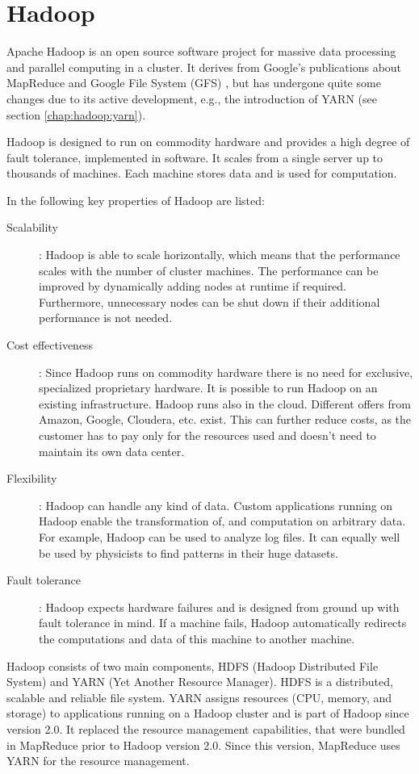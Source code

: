 \chapter{Hadoop}
\label{chap:hadoop}
Apache Hadoop is an open source software project for massive data processing and parallel computing in a cluster. It derives from Google's publications about MapReduce \cite{dean2008mapreduce} and Google File System (GFS) \cite{ghemawat2003google}, but has undergone quite some changes due to its active development, e.g., the introduction of YARN (see section \ref{chap:hadoop:yarn}).

Hadoop is designed to run on commodity hardware and provides a high degree of fault tolerance, implemented in software. It scales from a single server up to thousands of machines. Each machine stores data and is used for computation.

In the following key properties of Hadoop are listed:
\begin{description}
  \item[Scalability]: Hadoop is able to scale horizontally, which means that the performance scales with the number of cluster machines. The performance can be improved by dynamically adding nodes at runtime if required. Furthermore, unnecessary nodes can be shut down if their additional performance is not needed.
  \item[Cost effectiveness]: Since Hadoop runs on commodity hardware there is no need for exclusive, specialized proprietary hardware. It is possible to run Hadoop on an existing infrastructure. Hadoop runs also in the cloud. Different offers from Amazon, Google, Cloudera, etc. exist. This can further reduce costs, as the customer has to pay only for the resources used and doesn't need to maintain its own data center.
  \item[Flexibility]: Hadoop can handle any kind of data. Custom applications running on Hadoop enable the transformation of, and computation on arbitrary data. For example, Hadoop can be used to analyze log files. It can equally well be used by physicists to find patterns in their huge datasets.
  \item[Fault tolerance]: Hadoop expects hardware failures and is designed from ground up with fault tolerance in mind. If a machine fails, Hadoop automatically redirects the computations and data of this machine to another machine.
\end{description}

Hadoop consists of two main components, HDFS (Hadoop Distributed File System) and YARN (Yet Another Resource Manager). HDFS is a distributed, scalable and reliable file system. YARN assigns resources (CPU, memory, and storage) to applications running on a Hadoop cluster and is part of Hadoop since version 2.0. It replaced the resource management capabilities, that were bundled in MapReduce prior to Hadoop version 2.0. Since this version, MapReduce uses YARN for the resource management.

